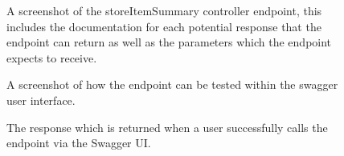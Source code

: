 \documentclass[a4paper,11pt]{report}
\begin{document}
\begin{appendix}
\begin{figure}[H]
        \caption{A screenshot of the storeItemSummary controller endpoint, this includes the documentation for each potential response that the endpoint can return as well as the parameters which the endpoint expects to receive.}
        \label{fig:endpointExample}
    \end{figure}
    \begin{figure}[H]
        \centering
        \caption{A screenshot of how the endpoint can be tested within the swagger user interface.}
        \label{fig:endpointTest}
    \end{figure}
    \begin{figure}[H]
        \centering
        \caption{The response which is returned when a user successfully calls the endpoint via the Swagger UI.}
        \label{fig:endpointTestResponse}
    \end{figure}
\end{appendix}
\end{document}

